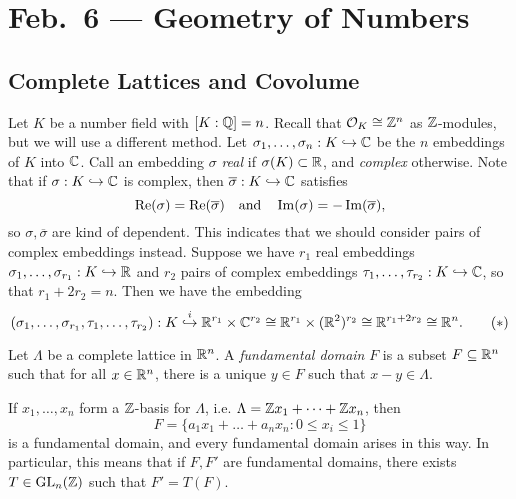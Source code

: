 \chapter{Feb.~6 --- Geometry of Numbers}

\section{Complete Lattices and Covolume}
\begin{remark}
  Let $K$ be a number field with $[K : \mathbb{Q}] = n$.
  Recall that $\mathcal{O}_K \cong \mathbb{Z}^n$ as $\mathbb{Z}$-modules, but
  we will use a different method.
  Let $\sigma_1, \dots, \sigma_n : K \hookrightarrow \mathbb{C}$
  be the $n$ embeddings of $K$ into $\mathbb{C}$.
  Call an embedding $\sigma$ \emph{real} if $\sigma(K) \subset \mathbb{R}$, and
  \emph{complex} otherwise. Note that if
  $\sigma : K \hookrightarrow \mathbb{C}$ is complex, then $\overline{\sigma} : K \hookrightarrow \mathbb{C}$
  satisfies
  \[
    \operatorname{Re}(\sigma) = \operatorname{Re}(\overline{\sigma}) \quad \text{and} \quad \operatorname{Im}(\sigma) = -\operatorname{Im}(\overline{\sigma}),
  \]
  so $\sigma, \overline{\sigma}$ are kind of dependent.
  This indicates that we should consider pairs of
  complex embeddings instead. Suppose we
  have $r_1$ real embeddings
  $\sigma_1, \dots, \sigma_{r_1} : K \hookrightarrow \mathbb{R}$ and $r_2$ pairs of complex embeddings
  $\tau_1, \dots, \tau_{r_2} : K \hookrightarrow \mathbb{C}$,
  so that $r_1 + 2r_2 = n$. Then we have the
  embedding
  \[
    (\sigma_1, \dots, \sigma_{r_1}, \tau_1, \dots, \tau_{r_2})
    : K \overset{i}{\hookrightarrow} \mathbb{R}^{r_1} \times \mathbb{C}^{r_2} \cong
    \mathbb{R}^{r_1} \times (\mathbb{R}^2)^{r_2} \cong \mathbb{R}^{r_1 + 2r_2} \cong \mathbb{R}^n. \tag{$*$}
  \]
\end{remark}

\begin{definition}
  Let $\Lambda$ be a complete lattice in $\mathbb{R}^n$. A
  \emph{fundamental domain} $F$ is a subset
  $F \subseteq \mathbb{R}^n$ such that for all
  $x \in \mathbb{R}^n$, there is a unique $y \in F$ such that
  $x - y \in \Lambda$.
\end{definition}

\begin{remark}
  If $x_1, \dots, x_n$ form a
  $\mathbb{Z}$-basis for $\Lambda$, i.e.
  $\Lambda = \mathbb{Z} x_1 + \cdots + \mathbb{Z} x_n$, then
  \[
    F = \{a_1 x_1 + \dots + a_n x_n : 0 \le x_i \le 1\}
  \]
  is a fundamental domain, and every fundamental
  domain arises in this way. In particular, this means
  that if $F, F'$ are fundamental domains,
  there exists $T \in \operatorname{GL}_n(\mathbb{Z})$ such that
  $F' = T(F)$.
\end{remark}

